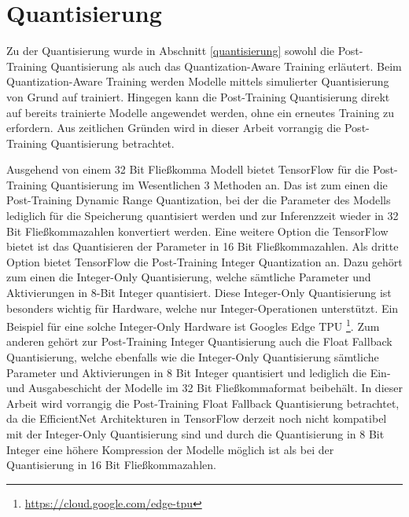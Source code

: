 \section{Quantisierung}
\label{impl_quantisierung}
Zu der Quantisierung wurde in Abschnitt \ref{quantisierung} sowohl die Post-Training Quantisierung als auch das Quantization-Aware Training erläutert. Beim Quantization-Aware Training werden Modelle mittels simulierter Quantisierung von Grund auf trainiert. Hingegen kann die Post-Training Quantisierung direkt auf bereits trainierte Modelle angewendet werden, ohne ein erneutes Training zu erfordern. Aus zeitlichen Gründen wird in dieser Arbeit vorrangig die Post-Training Quantisierung betrachtet.

Ausgehend von einem 32 Bit Fließkomma Modell bietet TensorFlow für die Post-Training Quantisierung im Wesentlichen 3 Methoden an. Das ist zum einen die Post-Training Dynamic Range Quantization, bei der die Parameter des Modells lediglich für die Speicherung quantisiert werden und zur Inferenzzeit wieder in 32 Bit Fließkommazahlen konvertiert werden. Eine weitere Option die TensorFlow bietet ist das Quantisieren der Parameter in 16 Bit Fließkommazahlen. Als dritte Option bietet TensorFlow die Post-Training Integer Quantization an. Dazu gehört zum einen die Integer-Only Quantisierung, welche sämtliche Parameter und Aktivierungen in 8-Bit Integer quantisiert. Diese Integer-Only Quantisierung ist besonders wichtig für Hardware, welche nur Integer-Operationen unterstützt. Ein Beispiel für eine solche Integer-Only Hardware ist Googles Edge TPU \footnote{\url{https://cloud.google.com/edge-tpu}}. Zum anderen gehört zur Post-Training Integer Quantisierung auch die Float Fallback Quantisierung, welche ebenfalls wie die Integer-Only Quantisierung sämtliche Parameter und Aktivierungen in 8 Bit Integer quantisiert und lediglich die Ein- und Ausgabeschicht der Modelle im 32 Bit Fließkommaformat beibehält. In dieser Arbeit wird vorrangig die Post-Training Float Fallback Quantisierung betrachtet, da die EfficientNet Architekturen in TensorFlow derzeit noch nicht kompatibel mit der Integer-Only Quantisierung sind und durch die Quantisierung in 8 Bit Integer eine höhere Kompression der Modelle möglich ist als bei der Quantisierung in 16 Bit Fließkommazahlen.

